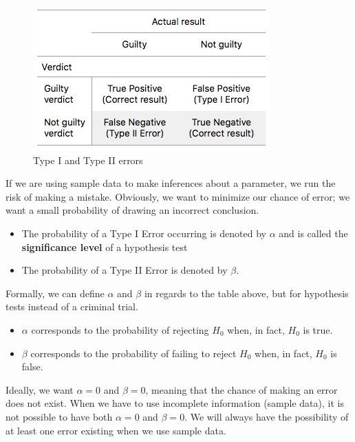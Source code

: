 \documentclass[12pt, krantz2,]{krantz}
\providecommand{\tightlist}{%
  \setlength{\itemsep}{0pt}\setlength{\parskip}{0pt}}
\begin{document}
\begin{figure}

{\centering \includegraphics[width=\textwidth]{images/error-types} 

}

\caption{Type I and Type II errors}\label{fig:trial-errors-table}
\end{figure}

If we are using sample data to make inferences about a parameter, we run the risk of making a mistake. Obviously, we want to minimize our chance of error; we want a small probability of drawing an incorrect conclusion.

\begin{itemize}
\tightlist
\item
  The probability of a Type I Error occurring is denoted by \(\alpha\) and is called the \textbf{significance level} of a hypothesis test
\item
  The probability of a Type II Error is denoted by \(\beta\).
\end{itemize}

Formally, we can define \(\alpha\) and \(\beta\) in regards to the table above, but for hypothesis tests instead of a criminal trial.

\begin{itemize}
\tightlist
\item
  \(\alpha\) corresponds to the probability of rejecting \(H_0\) when, in fact, \(H_0\) is true.
\item
  \(\beta\) corresponds to the probability of failing to reject \(H_0\) when, in fact, \(H_0\) is false.
\end{itemize}

Ideally, we want \(\alpha = 0\) and \(\beta = 0\), meaning that the chance of making an error does not exist. When we have to use incomplete information (sample data), it is not possible to have both \(\alpha = 0\) and \(\beta = 0\). We will always have the possibility of at least one error existing when we use sample data.
\end{document}
